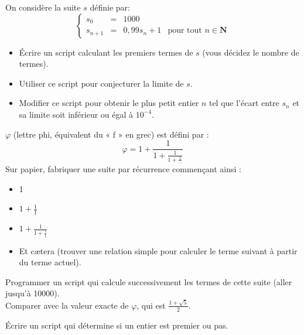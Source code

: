 \begin{exercice}
    On considère la suite $s$ définie par:
    \tabulardefault
    $$\left\{
    \begin{array}{llll}
    s_0 & = & 1000 & \\
    s_{n+1} & = & 0,99s_n+1 & \textrm{pour tout } n\in\mathbf{N}
    \end{array}
    \right. $$
    
    \begin{itemize}
        \item   \'Ecrire un script calculant les premiers termes de $s$ (vous décidez le nombre de termes).
        \item   Utiliser ce script pour conjecturer la limite de $s$.
        \item   Modifier ce script pour obtenir le plus petit entier $n$ tel que l'écart entre $s_n$ et sa limite soit inférieur ou égal à $10^{-4}$.
        
    \end{itemize}
\end{exercice}

\begin{exercice}
    $\varphi$ (lettre phi, équivalent du « f »  en grec) est défini par : $$\varphi=1+\frac{1}{1+\frac{1}{1+\frac{1}{\ldots}}}$$
    Sur papier, fabriquer une suite par récurrence commençant ainsi :
    \begin{itemize}
        \item   1
        \item   $1+\frac{1}{1}$
        \item   $1+\frac{1}{1+\frac{1}{1}}$
        \item   Et c\ae tera (trouver une relation simple pour calculer le terme suivant à partir du terme actuel).
    \end{itemize}
    Programmer un script qui calcule successivement les termes de cette suite (aller jusqu'à 10000\eme).\\
    
    Comparer avec la valeur exacte de $\varphi$, qui est $\frac{1+\sqrt{5}}{2}$.
\end{exercice}

\begin{exercice}
    \'Ecrire un script qui détermine si un entier est premier ou pas.
\end{exercice}